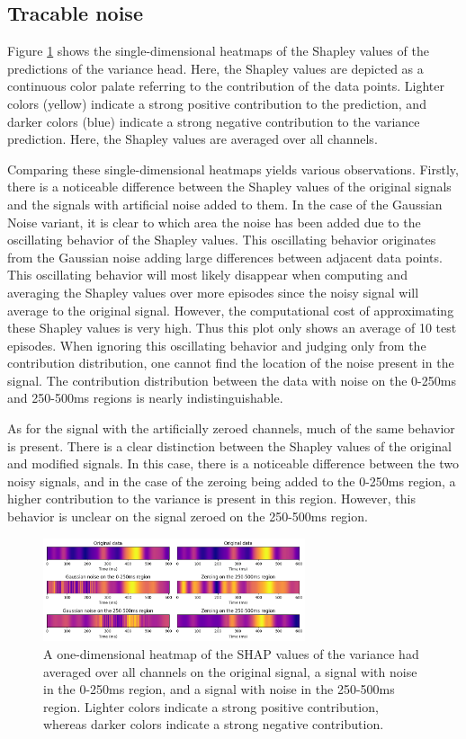 \subsection{Tracable noise}

Figure \ref{fig:shap} shows the single-dimensional heatmaps of the Shapley values of the predictions of the variance head. Here, the Shapley values are depicted as a continuous color palate referring to the contribution of the data points. Lighter colors (yellow) indicate a strong positive contribution to the prediction, and darker colors (blue) indicate a strong negative contribution to the variance prediction. Here, the Shapley values are averaged over all channels.

Comparing these single-dimensional heatmaps yields various observations. Firstly, there is a noticeable difference between the Shapley values of the original signals and the signals with artificial noise added to them. In the case of the Gaussian Noise variant, it is clear to which area the noise has been added due to the oscillating behavior of the Shapley values. This oscillating behavior originates from the Gaussian noise adding large differences between adjacent data points. This oscillating behavior will most likely disappear when computing and averaging the Shapley values over more episodes since the noisy signal will average to the original signal. However, the computational cost of approximating these Shapley values is very high. Thus this plot only shows an average of 10 test episodes. When ignoring this oscillating behavior and judging only from the contribution distribution, one cannot find the location of the noise present in the signal. The contribution distribution between the data with noise on the 0-250ms and 250-500ms regions is nearly indistinguishable.

As for the signal with the artificially zeroed channels, much of the same behavior is present. There is a clear distinction between the Shapley values of the original and modified signals. In this case, there is a noticeable difference between the two noisy signals, and in the case of the zeroing being added to the 0-250ms region, a higher contribution to the variance is present in this region. However, this behavior is unclear on the signal zeroed on the 250-500ms region.

\begin{figure}[!tbp]
    \centering
        \includegraphics[width=7.7cm]{img/shap.png}
    \caption{A one-dimensional heatmap of the SHAP values of the variance had averaged over all channels on the original signal, a signal with noise in the 0-250ms region, and a signal with noise in the 250-500ms region. Lighter colors indicate a strong positive contribution, whereas darker colors indicate a strong negative contribution.}
    \label{fig:shap}
\end{figure}
